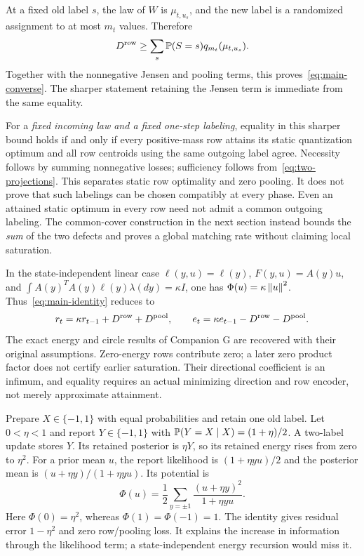 At a fixed old label $s$, the law of $W$ is $\mu_{t,u_s}$, and the new label is a randomized assignment to at most $m_t$ values. Therefore
\[
 D^{\rm row}\ge\sum_s\mathbb P(S=s)q_{m_t}(\mu_{t,u_s}).
\]
Together with the nonnegative Jensen and pooling terms, this proves~\eqref{eq:main-converse}. The sharper statement retaining the Jensen term is immediate from the same equality.

For a \emph{fixed incoming law and a fixed one-step labeling}, equality in this sharper bound holds if and only if every positive-mass row attains its static quantization optimum and all row centroids using the same outgoing label agree. Necessity follows by summing nonnegative losses; sufficiency follows from~\eqref{eq:two-projections}. This separates static row optimality and zero pooling. It does not prove that such labelings can be chosen compatibly at every phase. Even an attained static optimum in every row need not admit a common outgoing labeling. The common-cover construction in the next section instead bounds the \emph{sum} of the two defects and proves a global matching rate without claiming local saturation.

In the state-independent linear case $\ell(y,u)=\ell(y)$, $F(y,u)=A(y)u$, and $\int A(y)^TA(y)\ell(y)\lambda(dy)=\kappa I$, one has $\Phi(u)=\kappa\left\lVert u\right\rVert^2$. Thus~\eqref{eq:main-identity} reduces to
\[
 r_t=\kappa r_{t-1}+D^{\rm row}+D^{\rm pool},\qquad
 e_t=\kappa e_{t-1}-D^{\rm row}-D^{\rm pool}.
\]
The exact energy and circle results of Companion G are recovered with their original assumptions. Zero-energy rows contribute zero; a later zero product factor does not certify earlier saturation. Their directional coefficient is an infimum, and equality requires an actual minimizing direction and row encoder, not merely approximate attainment.

\begin{example}\label{ex:binary}
Prepare $X\in\{-1,1\}$ with equal probabilities and retain one old label. Let $0<\eta<1$ and report $Y\in\{-1,1\}$ with $\mathbb P(Y=X\mid X)=(1+\eta)/2$. A two-label update stores $Y$. Its retained posterior is $\eta Y$, so its retained energy rises from zero to $\eta^2$. For a prior mean $u$, the report likelihood is $(1+\eta yu)/2$ and the posterior mean is $(u+\eta y)/(1+\eta yu)$. Its potential is
\[
 \Phi(u)=\frac12\sum_{y=\pm1}\frac{(u+\eta y)^2}{1+\eta yu}.
\]
Here $\Phi(0)=\eta^2$, whereas $\Phi(1)=\Phi(-1)=1$. The identity gives residual error $1-\eta^2$ and zero row/pooling loss. It explains the increase in information through the likelihood term; a state-independent energy recursion would miss it.
\end{example}
